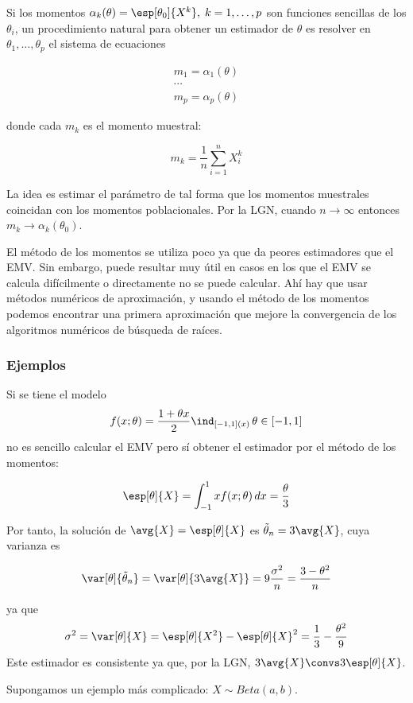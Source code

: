 \documentclass{apuntes}
\begin{document}
Si los momentos $\alpha_k(\theta) = \esp[\theta_0]{X^k},\;k=1,\dotsc,p$ son funciones sencillas de los $\theta_i$, un procedimiento natural para obtener un estimador de $\theta$ es resolver en $\theta_1,\dotsc,\theta_p$ el sistema de ecuaciones

\begin{gather*}
m_1 = \alpha_1(\theta) \\
\dotsb \\
m_p = \alpha_p(\theta)
\end{gather*}

donde cada $m_k$ es el momento muestral:

\[ m_k = \frac{1}{n}\sum\limits_{i=1}^n X_i^k \]

La idea es estimar el parámetro de tal forma que los momentos muestrales coincidan con los momentos poblacionales. Por la LGN, cuando $n\to\infty$ entonces $m_k \to \alpha_k(\theta_0)$.

El método de los momentos se utiliza poco ya que da peores estimadores que el EMV. Sin embargo, puede resultar muy útil en casos en los que el EMV se calcula difícilmente o directamente no se puede calcular. Ahí hay que usar métodos numéricos de aproximación, y usando el método de los momentos podemos encontrar una primera aproximación que mejore la convergencia de los algoritmos numéricos de búsqueda de raíces.

\subsubsection{Ejemplos}

Si se tiene el modelo \[f(x;\theta) = \frac{1+\theta x}{2}\ind_{[-1,1](x)}\,\theta\in[-1,1] \] no es sencillo calcular el EMV pero sí obtener el estimador por el método de los momentos:

\[ \esp[\theta]{X} = \int_{-1}^1 x f(x;\theta)\,dx = \frac{\theta}{3} \]

Por tanto, la solución de $\avg{X} = \esp[\theta]{X}$ es $\tilde\theta_n = 3\avg{X}$, cuya varianza es

\[ \var[\theta]{\tilde\theta_n} = \var[\theta]{3\avg{X}} = 9\frac{\sigma^2}{n} = \frac{3-\theta^2}{n} \]

ya que \[ \sigma^2 = \var[\theta]{X}= \esp[\theta]{X^2} - \esp[\theta]{X}^2 = \frac{1}{3}-\frac{\theta^2}{9} \] Este estimador es consistente ya que, por la LGN, $3\avg{X} \convs 3\esp[\theta]{X}$.

Supongamos un ejemplo más complicado: $X\sim Beta(a,b)$.
\end{document}
